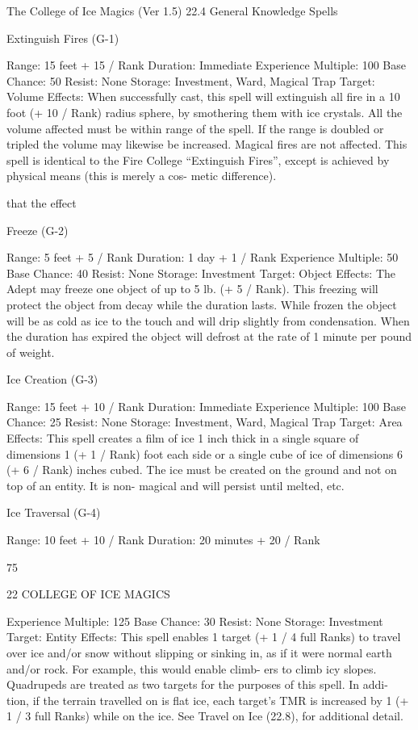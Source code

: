 \begin{Chapter}{The College of Ice Magics (Ver 1.5)}
22.4 General Knowledge Spells 

Extinguish Fires (G-1) 

Range: 15 feet + 15 / Rank 
Duration: Immediate 
Experience Multiple: 100 
Base Chance: 50%
Resist: None 
Storage: Investment, Ward, Magical Trap 
Target: Volume 
Effects:  When  successfully  cast,  this  spell  will 
extinguish all fire in a 10 foot (+ 10 / Rank) radius 
sphere,  by  smothering  them  with  ice  crystals.  All 
the  volume  affected  must  be  within  range  of  the 
spell. If the range is doubled or tripled the volume 
may  likewise  be  increased.  Magical  fires  are  not 
affected.  This  spell  is  identical  to the  Fire  College 
“Extinguish  Fires”,  except 
is 
achieved  by  physical  means  (this  is  merely  a  cos-
metic difference). 

that  the  effect 

Freeze (G-2) 

Range: 5 feet + 5 / Rank 
Duration: 1 day + 1 / Rank 
Experience Multiple: 50 
Base Chance: 40%
Resist: None 
Storage: Investment 
Target: Object 
Effects: The Adept may freeze  one object of up to 
5  lb.  (+  5  /  Rank).  This  freezing  will  protect  the 
object  from  decay  while  the  duration  lasts.  While 
frozen the object will be as cold as ice to the touch 
and will drip slightly from condensation. When the 
duration  has  expired  the  object  will  defrost  at  the 
rate of 1 minute per pound of weight. 

Ice Creation (G-3) 

Range: 15 feet + 10 / Rank 
Duration: Immediate 
Experience Multiple: 100 
Base Chance: 25%
Resist: None 
Storage: Investment, Ward, Magical Trap 
Target: Area 
Effects: This spell creates a film of ice 1 inch thick 
in a single square of dimensions 1 (+ 1 / Rank) foot 
each side or a single cube of ice of dimensions 6 (+ 
6 / Rank) inches cubed. The ice must be created on 
the  ground  and  not  on  top  of  an  entity.  It  is  non-
magical and will persist until melted, etc. 

Ice Traversal (G-4) 

Range: 10 feet + 10 / Rank 
Duration: 20 minutes + 20 / Rank 

75 

22 COLLEGE OF ICE MAGICS 

Experience Multiple: 125 
Base Chance: 30%
Resist: None 
Storage: Investment 
Target: Entity 
Effects:  This  spell  enables  1  target  (+  1  /  4  full 
Ranks)  to  travel  over  ice  and/or  snow  without 
slipping  or  sinking  in,  as  if  it  were  normal  earth 
and/or rock. For example, this would enable climb-
ers  to  climb  icy  slopes.  Quadrupeds  are  treated  as 
two  targets  for  the  purposes  of  this  spell.  In  addi-
tion,  if  the  terrain  travelled  on  is  flat  ice,  each 
target’s TMR is increased by 1 (+ 1 / 3 full Ranks) 
while  on  the  ice.  See  Travel  on  Ice  (22.8),  for 
additional detail. 


\end{Chapter}
